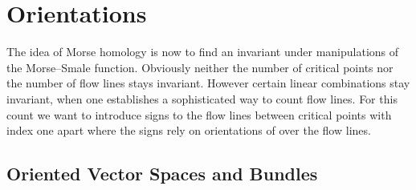 \section{Orientations}
The idea of Morse homology is now to find an invariant under manipulations of the Morse--Smale function. Obviously neither the number of critical points nor the number of flow lines stays invariant. However certain linear combinations stay invariant, when one establishes a sophisticated way to count flow lines. For this count we want to introduce signs to the flow lines between critical points with index one apart where the signs rely on orientations of over the flow lines.
\subsection{Oriented Vector Spaces and Bundles}




